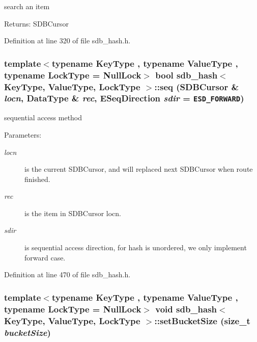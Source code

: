 search an item

\begin{Desc}
\item[Returns:]SDBCursor \end{Desc}


Definition at line 320 of file sdb\_\-hash.h.\hypertarget{classsdb__hash_08fcfc39a846687aa28ecfa4f919f3bc}{
\subsubsection[{seq}]{\setlength{\rightskip}{0pt plus 5cm}template$<$typename KeyType , typename ValueType , typename LockType  = NullLock$>$ bool {\bf sdb\_\-hash}$<$ KeyType, ValueType, LockType $>$::seq (SDBCursor \& {\em locn}, \/  DataType \& {\em rec}, \/  ESeqDirection {\em sdir} = {\tt ESD\_\-FORWARD})}}
\label{classsdb__hash_08fcfc39a846687aa28ecfa4f919f3bc}


sequential access method 

\begin{Desc}
\item[Parameters:]
\begin{description}
\item[{\em locn}]is the current SDBCursor, and will replaced next SDBCursor when route finished. \item[{\em rec}]is the item in SDBCursor locn. \item[{\em sdir}]is sequential access direction, for hash is unordered, we only implement forward case. \end{description}
\end{Desc}


Definition at line 470 of file sdb\_\-hash.h.\hypertarget{classsdb__hash_e56dbe504c8ae570e59a0571f8099b19}{
\subsubsection[{setBucketSize}]{\setlength{\rightskip}{0pt plus 5cm}template$<$typename KeyType , typename ValueType , typename LockType  = NullLock$>$ void {\bf sdb\_\-hash}$<$ KeyType, ValueType, LockType $>$::setBucketSize (size\_\-t {\em bucketSize})}}
\label{classsdb__hash_e56dbe504c8ae570e59a0571f8099b19}


